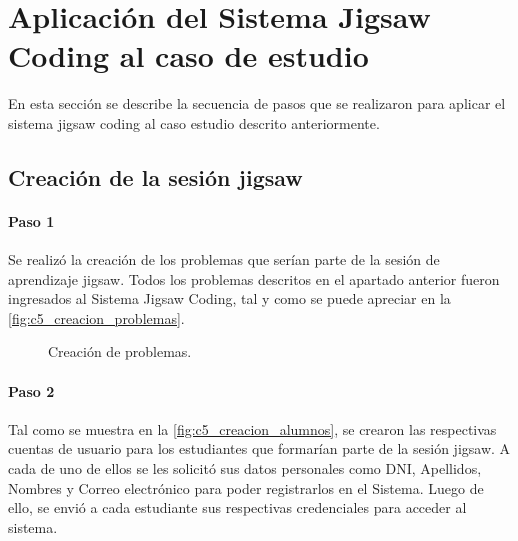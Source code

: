 \section{Aplicación del Sistema Jigsaw Coding al caso de estudio}
En esta sección se describe la secuencia de pasos que se realizaron para aplicar el sistema jigsaw coding al caso estudio descrito anteriormente.

\subsection{Creación de la sesión jigsaw}

\paragraph{Paso 1}
Se realizó la creación de los problemas que serían parte de la sesión de aprendizaje jigsaw. Todos los problemas descritos en el apartado anterior fueron ingresados al Sistema Jigsaw Coding, tal y como se puede apreciar en la \autoref{fig:c5_creacion_problemas}.

\begin{figure}[h!]
\centering
\caption{Creación de problemas.}
\label{fig:c5_creacion_problemas}
\end{figure}

\paragraph{Paso 2}
Tal como se muestra en la \autoref{fig:c5_creacion_alumnos}, se crearon las respectivas cuentas de usuario para los estudiantes que formarían parte de la sesión jigsaw. A cada de uno de ellos se les solicitó sus datos personales como DNI, Apellidos, Nombres y Correo electrónico para poder registrarlos en el Sistema. Luego de ello, se envió a cada estudiante sus respectivas credenciales para acceder al sistema.

